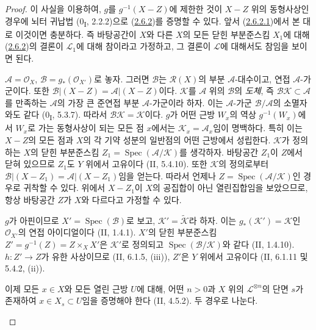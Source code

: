 \begin{proof}
이 사실을 이용하여, $g$를 $g^{-1}(X-Z)$에 제한한 것이 $X-Z$ 위의
동형사상인 경우에 뇌터 귀납법 (0\textsubscript{I}, 2.2.2)으로
(\hyperref[III.2.6.2-fr]{2.6.2})를 증명할 수 있다. 앞서
(\hyperref[III.2.6.2.1-fr]{2.6.2.1})에서 본 대로 이것이면 충분하다.
즉 바탕공간이 $X$와 다른 $X$의 모든 닫힌 부분준스킴 $X_1$에 대해
(\hyperref[III.2.6.2-fr]{2.6.2})의 결론이 $\mathcal L_1$에 대해
참이라고 가정하고, 그 결론이 $\mathcal L$에 대해서도 참임을 보이면
된다.

\begin{env}[2.6.2.4]
\label{III.2.6.2.4-fr}
$\mathcal A=\mathcal O_X$, $\mathcal B=g_*(\mathcal O_{X'})$로 놓자.
그러면 $\mathcal B$는 $\mathcal R(X)$의 부분 $\mathcal A$-대수이고,
연접 $\mathcal A$-가군이다. 또한
$\mathcal B|(X-Z)=\mathcal A|(X-Z)$이다. $\mathcal K$를
$\mathcal A$ 위의 $\mathcal B$의 \emph{도체}, 즉
$\mathcal B\mathcal K\subset\mathcal A$를 만족하는
$\mathcal A$의 가장 큰 준연접 부분 $\mathcal A$-가군이라 하자. 이는
$\mathcal A$-가군 $\mathcal B/\mathcal A$의 소멸자와도 같다
(0\textsubscript{I}, 5.3.7). 따라서
$\mathcal B\mathcal K=\mathcal K$이다. $g$가 어떤 근방 $W_x$의 역상
$g^{-1}(W_x)$에서 $W_x$로 가는 동형사상이 되는 모든 점 $x$에서는
$\mathcal K_x=\mathcal A_x$임이 명백하다. 특히 이는 $X-Z$의 모든
점과 $X$의 각 기약 성분의 일반점의 어떤 근방에서 성립한다.
$\mathcal K$가 정의하는 $X$의 닫힌 부분준스킴
$Z_1=\operatorname{Spec}(\mathcal A/\mathcal K)$를 생각하자.
바탕공간 $Z_1$이 $Z$에서 닫혀 있으므로 $Z_1$도 $Y$ 위에서 고유이다
(II, 5.4.10). 또한 $\mathcal K$의 정의로부터
$\mathcal B|(X-Z_1)=\mathcal A|(X-Z_1)$임을 얻는다. 따라서 언제나
$Z=\operatorname{Spec}(\mathcal A/\mathcal K)$인 경우로 귀착할 수
있다. 위에서 $X-Z_1$이 $X$의 공집합이 아닌 열린집합임을 보았으므로,
항상 바탕공간 $Z$가 $X$와 다르다고 가정할 수 있다.
\end{env}

\begin{env}[2.6.2.5]
\label{III.2.6.2.5-fr}
$g$가 아핀이므로 $X'=\operatorname{Spec}(\mathcal B)$로 보고,
$\mathcal K'=\widetilde{\mathcal K}$라 하자. 이는
$g_*(\mathcal K')=\mathcal K$인 $\mathcal O_{X'}$의 연접 아이디얼이다
(II, 1.4.1). $X'$의 닫힌 부분준스킴
$Z'=g^{-1}(Z)=Z\times_X X'$은 $\mathcal K'$로 정의되고
$\operatorname{Spec}(\mathcal B/\mathcal K)$와 같다 (II, 1.4.10).
$h:Z'\to Z$가 유한 사상이므로 (II, 6.1.5, (iii)), $Z'$은 $Y$ 위에서
고유이다 (II, 6.1.11 및 5.4.2, (ii)).

이제 모든 $x\in X$와 모든 열린 근방 $U$에 대해, 어떤 $n>0$과
$X$ 위의 $\mathcal L^{\otimes n}$의 단면 $s$가 존재하여
$x\in X_s\subset U$임을 증명해야 한다 (II, 4.5.2). 두 경우로
나눈다.


\end{env}
\end{proof}
